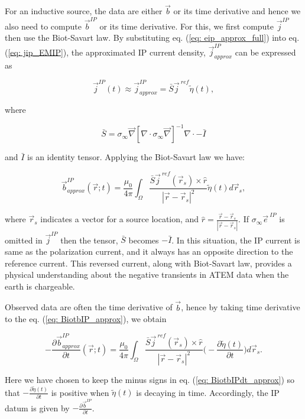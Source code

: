 \documentclass[extra,mreferee]{gji}
\renewcommand{\div}{\nabla\cdot}
\newcommand{\grad}{\vec \nabla}
\newcommand{\siginf}{\sigma_\infty}
\renewcommand {\j}  { {\vec j} }
\renewcommand {\b}  { {\vec b} }
\newcommand {\e}  { {\vec e} }
\newcommand{\peta}{\tilde{\eta}}
\newcommand{\jref}{\j^{\ ref}}
\begin{document}
For an inductive source, the data are either $\b$ or its time derivative and hence we also need to compute $\b^{IP}$ or its time derivative.
For this, we first compute $\j^{IP}$ then use the Biot-Savart law.
By substituting eq. (\ref{eq: eip_approx_full}) into eq. (\ref{eq: jip_EMIP}), the approximated IP current density, $\j^{IP}_{approx}$ can be expressed as
\begin{linenomath*}
\begin{equation}
  \j^{IP}(t) \approx \j^{IP}_{approx} = \bar{S}\jref\peta(t),
  \label{eq: jip_approx}
\end{equation}
\end{linenomath*}
where
\begin{linenomath*}
\begin{equation}
  \bar{S} = \siginf\grad[\div \siginf\grad]^{-1}\div-\bar{I}
\end{equation}
\end{linenomath*}
and $\bar{I}$ is an identity tensor.
Applying the Biot-Savart law we have:
\begin{linenomath*}
\begin{equation}
  \b^{IP}_{approx}(\vec{r}; t) = \frac{\mu_0}{4\pi}\int_{\Omega}  \frac{\bar{S}\j^{\ ref}(\vec{r}_s)\times\hat{r}}{|\vec{r}-\vec{r}_s|^2}\peta(t)d\vec{r}_s,
  \label{eq: BiotbIP_approx}
\end{equation}
\end{linenomath*}
where $\vec{r}_s$ indicates a vector for a source location, and $\hat{r}=\frac{\vec{r}-\vec{r}_s}{|\vec{r}-\vec{r}_s|}$.
If $\siginf\e^{\ IP}$ is omitted in  $\j^{IP}$ then the tensor, $\bar{S}$ becomes $-\bar{I}$.
In this situation, the IP current is same as the polarization current, and it always has an opposite direction to the reference current.
This reversed current, along with Biot-Savart law,  provides a physical understanding about the negative transients in ATEM data when the earth is chargeable.

Observed data are often the time derivative of $\b$, hence by taking time derivative to the eq. (\ref{eq: BiotbIP_approx}), we obtain
\begin{linenomath*}
\begin{equation}
  -\frac{\partial\b^{IP}_{approx}}{\partial t}(\vec{r}; t) = \frac{\mu_0}{4\pi} \int_{\Omega}  \frac{\bar{S}\jref(\vec{r}_s)\times\hat{r}}{|\vec{r}-\vec{r}_s|^2} \Big( -\frac{\partial \peta(t)}{\partial t} \Big) d\vec{r}_s.
  \label{eq: BiotbIPdt_approx}
\end{equation}
\end{linenomath*}
Here we have chosen to keep the minus signs in eq. (\ref{eq: BiotbIPdt_approx}) so that $-\frac{\partial \peta(t)}{\partial t}$ is positive when $\peta(t)$ is decaying in time.
Accordingly, the IP datum is given by  $-\frac{\partial\b^{IP}}{\partial t}$.
\end{document}
